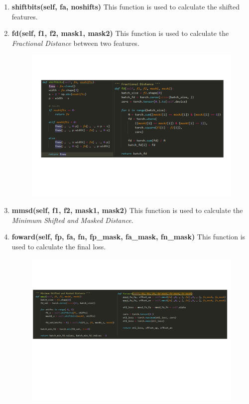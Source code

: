 \documentclass{article}
\begin{document}
\begin{enumerate}[1)]
	\item \textbf{shiftbits(self, fa, noshifts)} This function is used to calculate the shifted features.
	\item \textbf{fd(self, f1, f2, mask1, mask2)} This function is used to calculate the \textit{Fractional Distance} between two features.
	\begin{figure}[h]
		\centering
		\includegraphics[width=0.9\linewidth]{figs/sbfd.pdf}
	\end{figure}

	\item \textbf{mmsd(self, f1, f2, mask1, mask2)} This function is used to calculate the \textit{Minimum Shifted and Masked Distance}.
	\item \textbf{foward(self, fp, fa, fn, fp\_mask, fa\_mask, fn\_mask)} This function is used to calculate the final loss.
	
	\begin{figure}[h]
		\centering
		\includegraphics[width=0.9\linewidth]{figs/mmsdfor.pdf}
	\end{figure}
\end{enumerate}
\end{document}
